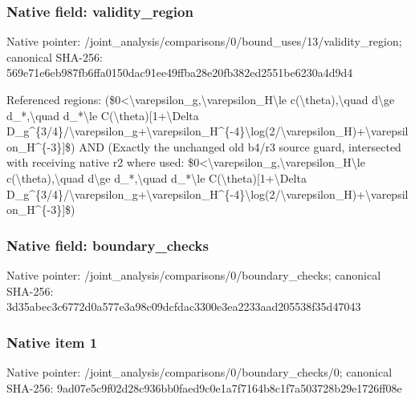 \documentclass[10pt,a4paper]{article}
\begin{document}
\subsubsection{Native field: validity\_\allowbreak{}region}
Native pointer: /joint\_\allowbreak{}analysis/comparisons/0/bound\_\allowbreak{}uses/13/validity\_\allowbreak{}region; canonical SHA-256: 569e71e6eb987fb6ffa0150dac91ee49ffba28e20fb382ed2551be6230a4d9d4

\begingroup\raggedright\sloppy Referenced regions:\allowbreak{} (\$0<\textbackslash{}varepsilon\_\allowbreak{}g,\allowbreak{}\textbackslash{}varepsilon\_\allowbreak{}H\textbackslash{}le c(\textbackslash{}theta),\allowbreak{}\textbackslash{}quad d\textbackslash{}ge d\_\allowbreak{}*,\allowbreak{}\textbackslash{}quad d\_\allowbreak{}*\textbackslash{}le C(\textbackslash{}theta)[1+\textbackslash{}Delta D\_\allowbreak{}g\textasciicircum{}\{3/\allowbreak{}4\}/\allowbreak{}\textbackslash{}varepsilon\_\allowbreak{}g+\textbackslash{}varepsilon\_\allowbreak{}H\textasciicircum{}\{-4\}\textbackslash{}log(2/\allowbreak{}\textbackslash{}varepsilon\_\allowbreak{}H)+\textbackslash{}varepsilon\_\allowbreak{}H\textasciicircum{}\{-3\}]\$) AND (Exactly the unchanged old b4/\allowbreak{}r3 source guard,\allowbreak{} intersected with receiving native r2 where used:\allowbreak{} \$0<\textbackslash{}varepsilon\_\allowbreak{}g,\allowbreak{}\textbackslash{}varepsilon\_\allowbreak{}H\textbackslash{}le c(\textbackslash{}theta),\allowbreak{}\textbackslash{}quad d\textbackslash{}ge d\_\allowbreak{}*,\allowbreak{}\textbackslash{}quad d\_\allowbreak{}*\textbackslash{}le C(\textbackslash{}theta)[1+\textbackslash{}Delta D\_\allowbreak{}g\textasciicircum{}\{3/\allowbreak{}4\}/\allowbreak{}\textbackslash{}varepsilon\_\allowbreak{}g+\textbackslash{}varepsilon\_\allowbreak{}H\textasciicircum{}\{-4\}\textbackslash{}log(2/\allowbreak{}\textbackslash{}varepsilon\_\allowbreak{}H)+\textbackslash{}varepsilon\_\allowbreak{}H\textasciicircum{}\{-3\}]\$)\par\endgroup

\subsubsection{Native field: boundary\_\allowbreak{}checks}
Native pointer: /joint\_\allowbreak{}analysis/comparisons/0/boundary\_\allowbreak{}checks; canonical SHA-256: 3d35abec3c6772d0a577e3a98c09dcfdac3300e3ea2233aad205538f35d47043

\subsubsection{Native item 1}
Native pointer: /joint\_\allowbreak{}analysis/comparisons/0/boundary\_\allowbreak{}checks/0; canonical SHA-256: 9ad07e5c9f02d28c936bb0faed9c0e1a7f7164b8c1f7a503728b29e1726ff08e
\end{document}
